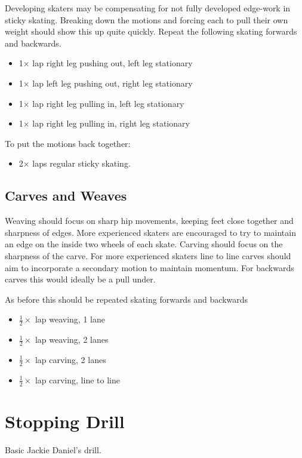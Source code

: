 \documentclass{journal}
\begin{document}
Developing skaters may be compensating for not fully developed edge-work in sticky skating. Breaking down the motions and forcing each to pull their own weight should show this up quite quickly.  
Repeat the following skating forwards and backwards. 
\begin{itemize}
    \item 1$\times$ lap right leg pushing out, left leg stationary  
    \item 1$\times$ lap left leg pushing out, right leg stationary 
    \item 1$\times$ lap right leg pulling in, left leg stationary 
    \item 1$\times$ lap right leg pulling in, right leg stationary 
\end{itemize}

To put the motions back together:
\begin{itemize}
    \item 2$\times$ laps regular sticky skating. 
\end{itemize}


\subsection*{Carves and Weaves}
\label{drill:sticky:carves_and_weaves}
Weaving should focus on sharp hip movements, keeping feet close together and sharpness of edges. More experienced skaters are encouraged to try to maintain an edge on the inside two wheels of each skate.     
Carving should focus on the sharpness of the carve.
For more experienced skaters line to line carves should aim to incorporate a secondary motion to maintain momentum. For backwards carves this would ideally be a pull under.    

As before this should be repeated skating forwards and backwards
\begin{itemize}
    \item $\frac{1}{2}\times$ lap weaving, 1 lane 
    \item $\frac{1}{2}\times$ lap weaving, 2 lanes
    \item $\frac{1}{2}\times$ lap carving, 2 lanes 
    \item $\frac{1}{2}\times$ lap carving, line to line
\end{itemize}



\section*{Stopping Drill}
\label{drill:stopping:jackie_daniels}
Basic Jackie Daniel's drill.
\end{document}
